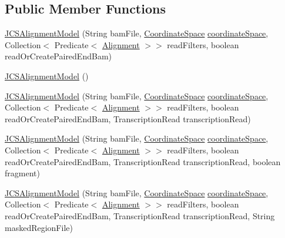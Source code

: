\subsection*{Public Member Functions}
\begin{DoxyCompactItemize}
\item 
\hyperlink{classumms_1_1core_1_1model_1_1_j_c_s_alignment_model_ac92de131b08dd4133de55ac37f9f2505}{J\+C\+S\+Alignment\+Model} (String bam\+File, \hyperlink{interfaceumms_1_1core_1_1coordinatesystem_1_1_coordinate_space}{Coordinate\+Space} \hyperlink{classumms_1_1core_1_1model_1_1_j_c_s_alignment_model_aa04751a0c366de794593489168749245}{coordinate\+Space}, Collection$<$ Predicate$<$ \hyperlink{interfaceumms_1_1core_1_1alignment_1_1_alignment}{Alignment} $>$$>$ read\+Filters, boolean read\+Or\+Create\+Paired\+End\+Bam)
\item 
\hyperlink{classumms_1_1core_1_1model_1_1_j_c_s_alignment_model_a338f7c8478f4737764d86f3c0ff9f15f}{J\+C\+S\+Alignment\+Model} ()
\item 
\hyperlink{classumms_1_1core_1_1model_1_1_j_c_s_alignment_model_a68a93aed6e17b615fe3eb3bc2e731ae4}{J\+C\+S\+Alignment\+Model} (String bam\+File, \hyperlink{interfaceumms_1_1core_1_1coordinatesystem_1_1_coordinate_space}{Coordinate\+Space} \hyperlink{classumms_1_1core_1_1model_1_1_j_c_s_alignment_model_aa04751a0c366de794593489168749245}{coordinate\+Space}, Collection$<$ Predicate$<$ \hyperlink{interfaceumms_1_1core_1_1alignment_1_1_alignment}{Alignment} $>$$>$ read\+Filters, boolean read\+Or\+Create\+Paired\+End\+Bam, Transcription\+Read transcription\+Read)
\item 
\hyperlink{classumms_1_1core_1_1model_1_1_j_c_s_alignment_model_a9ec427083c3bf3d33bd7247d31dc27c4}{J\+C\+S\+Alignment\+Model} (String bam\+File, \hyperlink{interfaceumms_1_1core_1_1coordinatesystem_1_1_coordinate_space}{Coordinate\+Space} \hyperlink{classumms_1_1core_1_1model_1_1_j_c_s_alignment_model_aa04751a0c366de794593489168749245}{coordinate\+Space}, Collection$<$ Predicate$<$ \hyperlink{interfaceumms_1_1core_1_1alignment_1_1_alignment}{Alignment} $>$$>$ read\+Filters, boolean read\+Or\+Create\+Paired\+End\+Bam, Transcription\+Read transcription\+Read, boolean fragment)
\item 
\hyperlink{classumms_1_1core_1_1model_1_1_j_c_s_alignment_model_a22e820b0ad7413162f4c590e2e421fa5}{J\+C\+S\+Alignment\+Model} (String bam\+File, \hyperlink{interfaceumms_1_1core_1_1coordinatesystem_1_1_coordinate_space}{Coordinate\+Space} \hyperlink{classumms_1_1core_1_1model_1_1_j_c_s_alignment_model_aa04751a0c366de794593489168749245}{coordinate\+Space}, Collection$<$ Predicate$<$ \hyperlink{interfaceumms_1_1core_1_1alignment_1_1_alignment}{Alignment} $>$$>$ read\+Filters, boolean read\+Or\+Create\+Paired\+End\+Bam, Transcription\+Read transcription\+Read, String masked\+Region\+File)

\end{DoxyCompactItemize}
